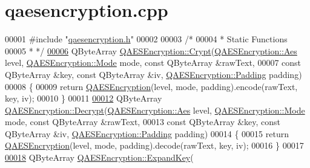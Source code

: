 \hypertarget{qaesencryption_8cpp_source}{}\section{qaesencryption.\+cpp}
\label{qaesencryption_8cpp_source}

\begin{DoxyCode}
00001 \textcolor{preprocessor}{#include "\hyperlink{qaesencryption_8h}{qaesencryption.h}"}
00002 
00003 \textcolor{comment}{/*}
00004 \textcolor{comment}{ * Static Functions}
00005 \textcolor{comment}{ * */}
\hypertarget{qaesencryption_8cpp_source.tex_l00006}{}\hyperlink{class_q_a_e_s_encryption_a43819eeb6a7cb29fbd3cb6ad640dcbdf}{00006} QByteArray \hyperlink{class_q_a_e_s_encryption_a43819eeb6a7cb29fbd3cb6ad640dcbdf}{QAESEncryption::Crypt}(\hyperlink{class_q_a_e_s_encryption_abe48208f4f6c7d68e6a10b49b9d0b7bd}{QAESEncryption::Aes} level, 
      \hyperlink{class_q_a_e_s_encryption_ad3e031c49a3d56566379d75b40b7b255}{QAESEncryption::Mode} mode, \textcolor{keyword}{const} QByteArray &rawText,
00007                                  \textcolor{keyword}{const} QByteArray &key, \textcolor{keyword}{const} QByteArray &iv, 
      \hyperlink{class_q_a_e_s_encryption_ab0a65cdea4eac21ef32530010d1b0247}{QAESEncryption::Padding} padding)
00008 \{
00009     \textcolor{keywordflow}{return} \hyperlink{class_q_a_e_s_encryption_aeac0ee8532e69e5d30b023fe38c30b3b}{QAESEncryption}(level, mode, padding).encode(rawText, key, iv);
00010 \}
00011 
\hypertarget{qaesencryption_8cpp_source.tex_l00012}{}\hyperlink{class_q_a_e_s_encryption_af9baa154a06683049d941bd06ac698fd}{00012} QByteArray \hyperlink{class_q_a_e_s_encryption_af9baa154a06683049d941bd06ac698fd}{QAESEncryption::Decrypt}(\hyperlink{class_q_a_e_s_encryption_abe48208f4f6c7d68e6a10b49b9d0b7bd}{QAESEncryption::Aes} level, 
      \hyperlink{class_q_a_e_s_encryption_ad3e031c49a3d56566379d75b40b7b255}{QAESEncryption::Mode} mode, \textcolor{keyword}{const} QByteArray &rawText,
00013                                    \textcolor{keyword}{const} QByteArray &key, \textcolor{keyword}{const} QByteArray &iv, 
      \hyperlink{class_q_a_e_s_encryption_ab0a65cdea4eac21ef32530010d1b0247}{QAESEncryption::Padding} padding)
00014 \{
00015      \textcolor{keywordflow}{return} \hyperlink{class_q_a_e_s_encryption_aeac0ee8532e69e5d30b023fe38c30b3b}{QAESEncryption}(level, mode, padding).decode(rawText, key, iv);
00016 \}
00017 
\hypertarget{qaesencryption_8cpp_source.tex_l00018}{}\hyperlink{class_q_a_e_s_encryption_a2112456e057e6dd886694348fbf202cd}{00018} QByteArray \hyperlink{class_q_a_e_s_encryption_a2112456e057e6dd886694348fbf202cd}{QAESEncryption::ExpandKey}(

\end{DoxyCode}
